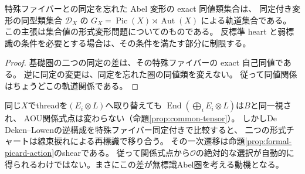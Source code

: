 \begin{corollary}[無標識形式変形の同値類集合]
\label{cor:aou-formal-unmarked-quotient}
特殊ファイバーとの同定を忘れた Abel 変形の exact 同値類集合は、
同定付き変形の同型類集合 $\mathcal D_X$ の
$G_X=\operatorname{Pic}(X)\rtimes\operatorname{Aut}(X)$ による軌道集合である。
この主張は集合値の形式変形問題についてのものである。
反標準 heart と弱標識の条件を必要とする場合は、その条件を満たす部分に制限する。
\end{corollary}
\begin{proof}
基礎圏の二つの同定の差は、その特殊ファイバーの exact 自己同値である。
逆に同定の変更は、同定を忘れた圏の同値類を変えない。
従って同値関係はちょうどこの軌道関係である。
\end{proof}

\begin{remark}[共通線束捩れと形式チャートの非標準性]
\label{rem:formal-common-twist}
同じ$X$でthreadを$(E_i\otimes L)$へ取り替えても
$\operatorname{End}(\bigoplus_iE_i\otimes L)$は$B$と同一視され、
AOU関係式点は変わらない（命題\ref{prop:common-tensor}）。
しかしDe Deken--Lowenの逆構成を特殊ファイバー同定付きで比較すると、
二つの形式チャートは線束捩れによる再標識で移り合う。
その一次遷移は命題\ref{prop:formal-picard-action}のshearである。
従って関係式点から$\mathcal O$の絶対的な選択が自動的に
得られるわけではない。まさにこの差が無標識Abel圏を考える動機となる。
\end{remark}
